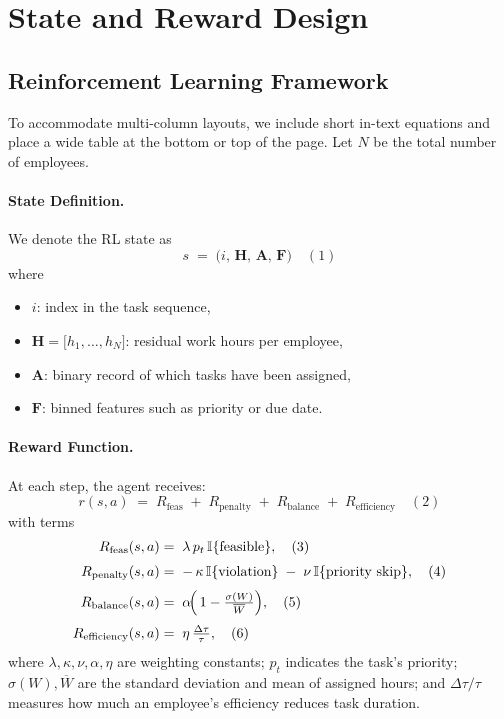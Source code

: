 \documentclass[conference]{IEEEtran}
\begin{document}
	\section{State and Reward Design}
	
	\subsection{Reinforcement Learning Framework}
	
	To accommodate multi-column layouts, we include short in-text equations and place a wide table at the bottom or top of the page. Let $N$ be the total number of employees.
	
	\paragraph{State Definition.}
	We denote the RL state as 
	\[
	s \;=\; \bigl(i,\,\mathbf{H},\,\mathbf{A},\,\mathbf{F}\bigr)\quad (1)
	\]
	where 
	\begin{itemize}
		\item $i$: index in the task sequence, 
		\item $\mathbf{H} = \bigl[h_{1}, \dots, h_{N}\bigr]$: residual work hours per employee, 
		\item $\mathbf{A}$: binary record of which tasks have been assigned, 
		\item $\mathbf{F}$: binned features such as priority or due date.
	\end{itemize}
	
	\paragraph{Reward Function.}
	At each step, the agent receives:
	\[
	r(s,a) \;=\; R_{\text{feas}} \;+\; R_{\text{penalty}} \;+\; R_{\text{balance}} \;+\; R_{\text{efficiency}}
	\quad (2)
	\]
	with terms
	\begin{align*}
		R_{\text{feas}}(s,a) 
		&=\; \lambda\,p_{t}\,\mathbb{I}\{\text{feasible}\}, 
		\quad(3)\\[1mm]
		R_{\text{penalty}}(s,a) 
		&=\; -\,\kappa\,\mathbb{I}\{\text{violation}\}\;-\;\nu\,\mathbb{I}\{\text{priority skip}\},
		\quad(4)\\[1mm]
		R_{\text{balance}}(s,a) 
		&=\; \alpha\!\Bigl(\,1-\tfrac{\sigma(W)}{\overline{W}}\Bigr),
		\quad(5)\\[1mm]
		R_{\text{efficiency}}(s,a) 
		&=\; \eta\,\tfrac{\Delta\tau}{\tau},
		\quad(6)
	\end{align*}
	where $\lambda,\kappa,\nu,\alpha,\eta$ are weighting constants; $p_{t}$ indicates the task’s priority; $\sigma(W),\overline{W}$ are the standard deviation and mean of assigned hours; and $\Delta\tau/\tau$ measures how much an employee’s efficiency reduces task duration.
	
\end{document}
